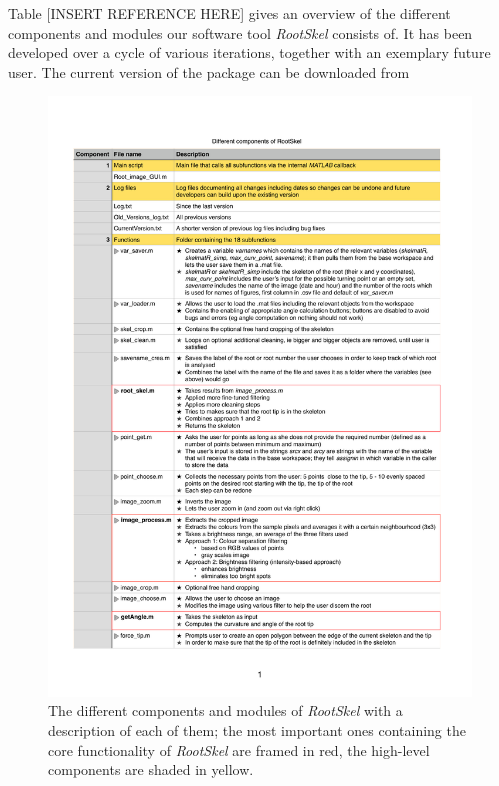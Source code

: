 %


Table [INSERT REFERENCE HERE] gives an overview of the different components and modules our software tool \textit{RootSkel} consists of. It has been developed over a cycle of various iterations, together with an exemplary future user. 
The current version of the package can be downloaded from %


\begin{figure}[h]
	\centering
	\includegraphics[width=\textwidth]{../Figures/components.pdf}
	\caption{The different components and modules of \textit{RootSkel} with a description of each of them; the most important ones containing the core functionality of \textit{RootSkel} are framed in red, the high-level components are shaded in yellow.}
	\label{fig:modules}
\end{figure}


